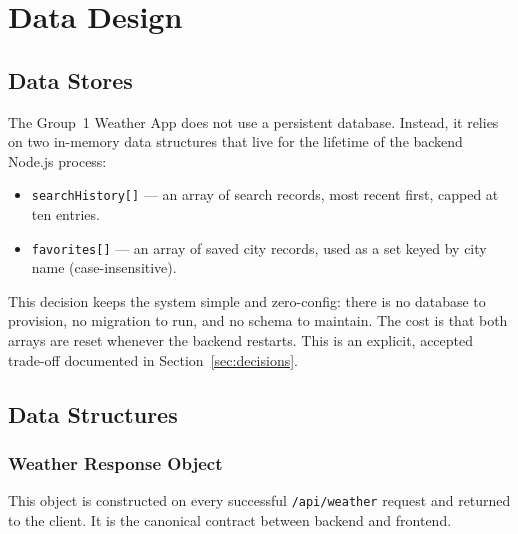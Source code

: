 \documentclass[11pt,letterpaper]{article}
\begin{document}
\section{Data Design}

\subsection{Data Stores}
The Group~1 Weather App does not use a persistent database. Instead, it relies on two in-memory data structures that live for the lifetime of the backend Node.js process:
\begin{itemize}
  \item \texttt{searchHistory[]} --- an array of search records, most recent first, capped at ten entries.
  \item \texttt{favorites[]} --- an array of saved city records, used as a set keyed by city name (case-insensitive).
\end{itemize}
This decision keeps the system simple and zero-config: there is no database to provision, no migration to run, and no schema to maintain. The cost is that both arrays are reset whenever the backend restarts. This is an explicit, accepted trade-off documented in Section~\ref{sec:decisions}.

\subsection{Data Structures}

\subsubsection*{Weather Response Object}
This object is constructed on every successful \texttt{/api/weather} request and returned to the client. It is the canonical contract between backend and frontend.
\end{document}
